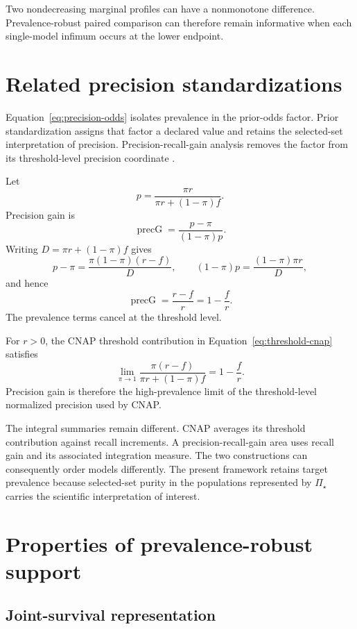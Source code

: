 \documentclass[11pt]{article}
\newcommand{\PSet}{\Pi_\star}
\theoremstyle{remark}
\begin{document}
Two nondecreasing marginal profiles can have a nonmonotone difference. Prevalence-robust paired comparison can therefore remain informative when each single-model infimum occurs at the lower endpoint.

\section{Related precision standardizations}
\label{app:related}

Equation~\eqref{eq:precision-odds} isolates prevalence in the prior-odds factor. Prior standardization assigns that factor a declared value and retains the selected-set interpretation of precision. Precision-recall-gain analysis removes the factor from its threshold-level precision coordinate \cite{flach2015prg}.

Let
\[
p
=
\frac{\pi r}{\pi r+(1-\pi)f}.
\]
Precision gain is
\[
\operatorname{precG}
=
\frac{p-\pi}{(1-\pi)p}.
\]
Writing $D=\pi r+(1-\pi)f$ gives
\[
p-\pi
=
\frac{\pi(1-\pi)(r-f)}{D},
\qquad
(1-\pi)p
=
\frac{(1-\pi)\pi r}{D},
\]
and hence
\begin{equation}
\operatorname{precG}
=
\frac{r-f}{r}
=
1-\frac{f}{r}.
\label{eq:precision-gain}
\end{equation}
The prevalence terms cancel at the threshold level.

For $r>0$, the CNAP threshold contribution in Equation~\eqref{eq:threshold-cnap} satisfies
\begin{equation}
\lim_{\pi\to1}
\frac{\pi(r-f)}
{\pi r+(1-\pi)f}
=
1-\frac{f}{r}.
\label{eq:precision-gain-limit}
\end{equation}
Precision gain is therefore the high-prevalence limit of the threshold-level normalized precision used by CNAP.

The integral summaries remain different. CNAP averages its threshold contribution against recall increments. A precision-recall-gain area uses recall gain and its associated integration measure. The two constructions can consequently order models differently. The present framework retains target prevalence because selected-set purity in the populations represented by $\PSet$ carries the scientific interpretation of interest.

\section{Properties of prevalence-robust support}
\label{app:proofs}

\subsection{Joint-survival representation}
\end{document}
